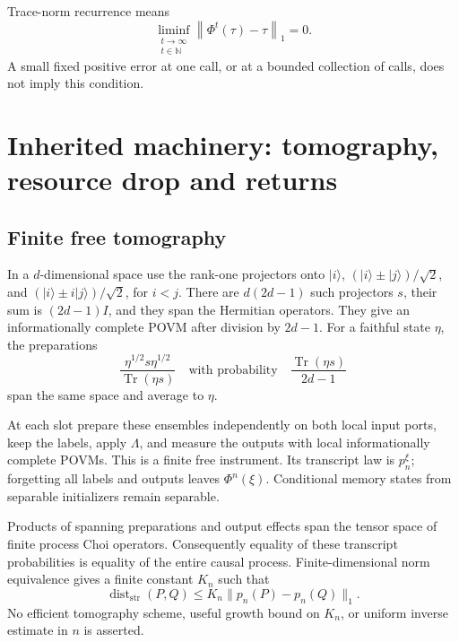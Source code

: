 \documentclass[11pt,a4paper]{article}
\numberwithin{equation}{section}
\theoremstyle{remark}
\newcommand{\tr}{\operatorname{Tr}}
\newcommand{\dd}{\operatorname{dist}_{\mathrm{str}}}
\newcommand{\normone}[1]{\left\|#1\right\|_1}
\newcommand{\ket}[1]{|#1\rangle}
\begin{document}
Trace-norm recurrence means
\begin{equation}
 \liminf_{\substack{t\to\infty\\t\in\mathbb N}}
       \normone{\Phi^t(\tau)-\tau}=0.              \label{eq:recurrence}
\end{equation}
A small fixed positive error at one call, or at a bounded collection of calls,
does not imply this condition.

\section{Inherited machinery: tomography, resource drop and returns}
\subsection{Finite free tomography}
In a \(d\)-dimensional space use the rank-one projectors onto
\(\ket i\), \((\ket i\pm\ket j)/\sqrt2\), and
\((\ket i\pm i\ket j)/\sqrt2\), for \(i<j\).
There are \(d(2d-1)\) such projectors \(s\), their sum is
\((2d-1)I\), and they span the Hermitian operators. They give an
informationally complete POVM after division by \(2d-1\).
For a faithful state \(\eta\), the preparations
\[
 \frac{\eta^{1/2}s\eta^{1/2}}{\tr(\eta s)}
 \quad\text{with probability}\quad
 \frac{\tr(\eta s)}{2d-1}
\]
span the same space and average to \(\eta\).

At each slot prepare these ensembles independently on both local input
ports, keep the labels, apply \(\Lambda\), and measure the outputs with
local informationally complete POVMs. This is a finite free instrument.
Its transcript law is \(p_n^\xi\); forgetting all labels and outputs leaves
\(\Phi^n(\xi)\). Conditional memory states from separable initializers
remain separable.

Products of spanning preparations and output effects span the tensor
space of finite process Choi operators. Consequently equality of these
transcript probabilities is equality of the entire causal process.
Finite-dimensional norm equivalence gives a finite constant \(K_n\) such that
\begin{equation}
 \dd(P,Q)\leq K_n\|p_n(P)-p_n(Q)\|_1.             \label{eq:IC}
\end{equation}
No efficient tomography scheme, useful growth bound on \(K_n\), or uniform
inverse estimate in \(n\) is asserted.
\end{document}
